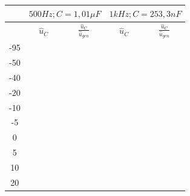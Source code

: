 \documentclass{article}
\begin{document}
\begin{table}[h]
  \begin{center}

    \begin{tabular}{|c|c|c|c|c|}
      \hline
          & \multicolumn{2}{c|}{$500Hz; C=1,01\mu F$} & \multicolumn{2}{c|}{$1kHz; C= 253,3 nF$}                                                   \\
      \hline
          & $\hat{u}_C$                               & $\frac{\hat{u}_C}{\hat{u}_{gen}}$        & $\hat{u}_C$ & $\frac{\hat{u}_C}{\hat{u}_{gen}}$ \\
      \hline
      -95 &                                           &                                          &             &                                   \\
      \hline
      -50 &                                           &                                          &             &                                   \\
      \hline
      -40 &                                           &                                          &             &                                   \\
      \hline
      -20 &                                           &                                          &             &                                   \\
      \hline
      -10 &                                           &                                          &             &                                   \\
      \hline
      -5  &                                           &                                          &             &                                   \\
      \hline
      0   &                                           &                                          &             &                                   \\
      \hline
      5   &                                           &                                          &             &                                   \\
      \hline
      10  &                                           &                                          &             &                                   \\
      \hline
      20  &                                           &                                          &             &                                   \\

\end{tabular}
\end{center}
\end{table}
\end{document}
